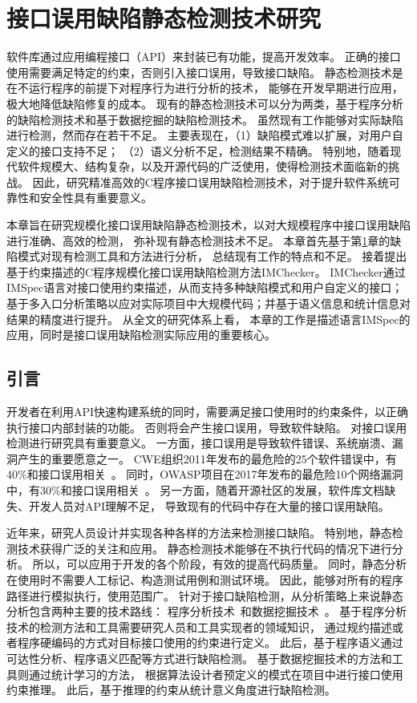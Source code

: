 \chapter{接口误用缺陷静态检测技术研究}
\label{cha:imchecker}
软件库通过应用编程接口（API）来封装已有功能，提高开发效率。
正确的接口使用需要满足特定的约束，否则引入接口误用，导致接口缺陷。
静态检测技术是在不运行程序的前提下对程序行为进行分析的技术，
能够在开发早期进行应用，
极大地降低缺陷修复的成本。
现有的静态检测技术可以分为两类，基于程序分析的缺陷检测技术和基于数据挖掘的缺陷检测技术。
虽然现有工作能够对实际缺陷进行检测，然而存在若干不足。
主要表现在，（1）缺陷模式难以扩展，对用户自定义的接口支持不足；
（2）语义分析不足，检测结果不精确。
特别地，随着现代软件规模大、结构复杂，以及开源代码的广泛使用，使得检测技术面临新的挑战。
因此，研究精准高效的C程序接口误用缺陷检测技术，对于提升软件系统可靠性和安全性具有重要意义。

本章旨在研究规模化接口误用缺陷静态检测技术，以对大规模程序中接口误用缺陷进行准确、高效的检测，
弥补现有静态检测技术不足。
本章首先基于第\ref{cha:imchecker}章的缺陷模式对现有检测工具和方法进行分析，
总结现有工作的特点和不足。
接着提出基于约束描述的C程序规模化接口误用缺陷检测方法IMChecker。
IMChecker通过IMSpec语言对接口使用约束描述，从而支持多种缺陷模式和用户自定义的接口；
基于多入口分析策略以应对实际项目中大规模代码；并基于语义信息和统计信息对结果的精度进行提升。
从全文的研究体系上看，
本章的工作是描述语言IMSpec的应用，同时是接口误用缺陷检测实际应用的重要核心。

\section{引言}
开发者在利用API快速构建系统的同时，需要满足接口使用时的约束条件，以正确执行接口内部封装的功能。
否则将会产生接口误用，导致软件缺陷。
对接口误用检测进行研究具有重要意义。
一方面，接口误用是导致软件错误、系统崩溃、漏洞产生的重要愿意之一。
CWE组织2011年发布的最危险的25个软件错误中，有40\%和接口误用相关~\cite{cwe-top25}。
同时，OWASP项目在2017年发布的最危险10个网络漏洞中，有30\%和接口误用相关~\cite{owasp-top10}。
另一方面，随着开源社区的发展，软件库文档缺失、开发人员对API理解不足，
导致现有的代码中存在大量的接口误用缺陷。

近年来，研究人员设计并实现各种各样的方法来检测接口缺陷。
特别地，静态检测技术获得广泛的关注和应用。
静态检测技术能够在不执行代码的情况下进行分析。
所以，可以应用于开发的各个阶段，有效的提高代码质量。
同时，静态分析在使用时不需要人工标记、构造测试用例和测试环境。
因此，能够对所有的程序路径进行模拟执行，使用范围广。
针对于接口缺陷检测，从分析策略上来说静态分析包含两种主要的技术路线：
程序分析技术~\cite{16-saner-evaluation}和数据挖掘技术~\cite{survey18}。
基于程序分析技术的检测方法和工具需要研究人员和工具实现者的领域知识，
通过规约描述或者程序硬编码的方式对目标接口使用的约束进行定义。
此后，基于程序语义通过可达性分析、程序语义匹配等方式进行缺陷检测。
基于数据挖掘技术的方法和工具则通过统计学习的方法，
根据算法设计者预定义的模式在项目中进行接口使用约束推理。
此后，基于推理的约束从统计意义角度进行缺陷检测。


